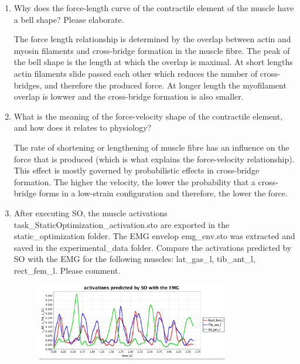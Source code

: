 \documentclass[11pt]{article}
\begin{document}
\begin{enumerate}
\begin{adjustwidth}{0.5cm}{}
\begin{figure}[h!]
            \caption{Plots of the hip, knee and ankle flexion-extension (flexion-dorsiflexion for the ankle) moments over time (in $N\cdot m$).}
        \end{figure}
    \end{adjustwidth}
    \item Why does the force-length curve of the contractile element of the muscle have a bell shape? Please elaborate. 
    \begin{adjustwidth}{0.5cm}{}
        The force length relationship is determined by the overlap between actin and myosin filaments and cross-bridge formation in the muscle fibre. The peak of the bell shape is the length at which the overlap is maximal. At short lengths actin filaments slide passed each other which reduces the number of cross-bridges, and therefore the produced force. At longer length the myofilament overlap is lowwer and the cross-bridge formation is also smaller. 
    \end{adjustwidth}
    \item What is the meaning of the force-velocity shape of the contractile element, and how does it relates to physiology? 
    \begin{adjustwidth}{0.5cm}{}
        The rate of shortening or lengthening of muscle fibre has an influence on the force that is produced (which is what explains the force-velocity relationship). This effect is mostly governed by probabilistic effects in cross-bridge formation. The higher the velocity, the lower the probability that a cross-bridge forms in a low-strain configuration and therefore, the lower the force.
    \end{adjustwidth}
    \item After executing SO, the muscle activations task\_StaticOptimization\_activation.sto are exported in the static\_optimization folder. The EMG envelop emg\_env.sto was extracted and saved in the experimental\_data folder. Compare the activations predicted by SO with the EMG for the following muscles: lat\_gas\_l, tib\_ant\_l, rect\_fem\_l. Please comment.
    \begin{adjustwidth}{0.5cm}{}
        \begin{figure}[h!]
            \centering
            \includegraphics[width=0.8\textwidth]{screens/SO_Activation.jpg}

\end{figure}
\end{adjustwidth}
\end{enumerate}
\end{document}
